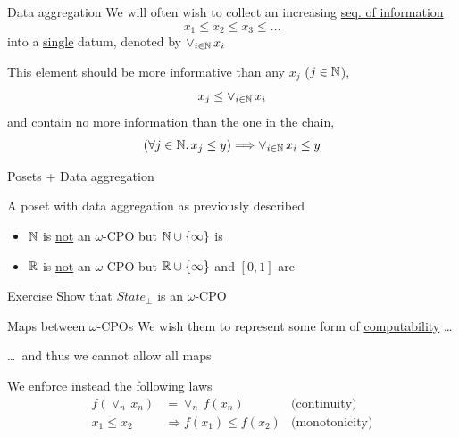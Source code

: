 \documentclass{beamer}
\begin{document}
\begin{frame}{Data aggregation}
        We will often wish to collect an increasing \alert{\underline{seq. of information}}
        \[
                x_1 \leq x_2 \leq x_3 \leq \dots
        \]
        into a \alert{\underline{single}} datum, denoted by $\vee_{i \in \mathbb{N}}\, x_i$

        \pause
        \bigskip
        This element should be \alert{\underline{more informative}}
        than any $x_j$ ($j \in \mathbb{N}$), \ie\
        \[
                x_j \leq \vee_{i \in \mathbb{N}}\, x_i
        \]
        and contain \alert{\underline{no more information}} than the one
        in the chain, \ie\
        \[
                (\forall j \in \mathbb{N}. \, x_j \leq y) \Longrightarrow
                \vee_{i \in \mathbb{N}}\, x_i \leq y
        \]
\end{frame}

\begin{frame}{Posets + Data aggregation}

        \begin{definition}
                A poset with data aggregation as previously described
        \end{definition}

        \begin{examples}
                \begin{itemize}
                        \item $\mathbb{N}$ is \underline{not} an $\omega$-CPO but
                                $\mathbb{N} \cup \{ \infty \}$ is
                        \item $\mathbb{R}$ is \underline{not} an $\omega$-CPO but
                                $\mathbb{R} \cup \{ \infty \}$ and $[0,1]$ are
                \end{itemize}
        \end{examples}

        \pause
        \bigskip
        \begin{block}{Exercise}
                Show that $State_\bot$ is an $\omega$-CPO
        \end{block}
\end{frame}

\begin{frame}{Maps between $\omega$-CPOs}
        We wish them to represent some form of
        \alert{\underline{computability}} \dots

        \dots\ and thus we cannot allow all maps

        \pause
        \bigskip
        We enforce instead the following laws
        \begin{align*}
                f(\vee_n\, x_n) & = \vee_{n}\, f(x_n) & \text{(continuity)}
                \\
                x_1 \leq x_2 & \Rightarrow f(x_1) \leq f(x_2) & \text{(monotonicity)}
        \end{align*}
\end{frame}
\end{document}
